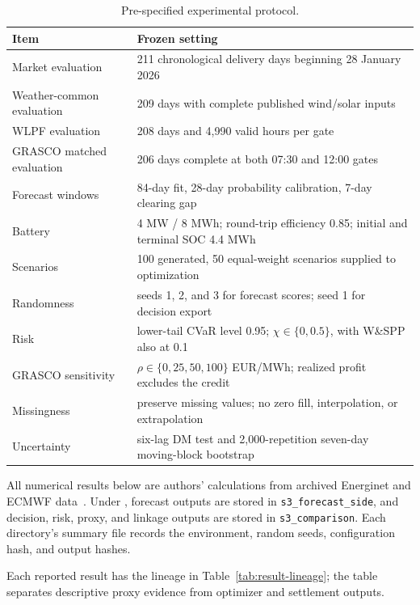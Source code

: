 \documentclass[11pt,a4paper]{article}
\begin{document}
\begin{table}[htbp]
  \centering
  \small
  \caption{Pre-specified experimental protocol.}
  \begin{tabular}{p{}p{}}
    \toprule
    Item & Frozen setting \\
    \midrule
    Market evaluation
      & 211 chronological delivery days beginning 28 January 2026 \\
    Weather-common evaluation
      & 209 days with complete published wind/solar inputs \\
    WLPF evaluation
      & 208 days and 4,990 valid hours per gate \\
    GRASCO matched evaluation
      & 206 days complete at both 07:30 and 12:00 gates \\
    Forecast windows
      & 84-day fit, 28-day probability calibration, 7-day clearing gap \\
    Battery
      & 4 MW / 8 MWh; round-trip efficiency 0.85; initial and terminal SOC 4.4 MWh \\
    Scenarios
      & 100 generated, 50 equal-weight scenarios supplied to optimization \\
    Randomness
      & seeds 1, 2, and 3 for forecast scores; seed 1 for decision export \\
    Risk
      & lower-tail CVaR level 0.95; $\chi\in\{0,0.5\}$, with W\&SPP also at 0.1 \\
    GRASCO sensitivity
      & $\rho\in\{0,25,50,100\}$ EUR/MWh; realized profit excludes the credit \\
    Missingness
      & preserve missing values; no zero fill, interpolation, or extrapolation \\
    Uncertainty
      & six-lag DM test and 2,000-repetition seven-day moving-block bootstrap \\
    \bottomrule
  \end{tabular}
  \label{tab:experimental-protocol}
\end{table}

All numerical results below are authors' calculations from archived Energinet
and ECMWF data~\cite{energineteds,openmeteo2026singleruns}.  Under
, forecast outputs are stored in
\texttt{s3\_forecast\_side}, and decision, risk, proxy, and linkage outputs are
stored in \texttt{s3\_comparison}.  Each directory's summary file
records the environment, random seeds, configuration hash, and output hashes.

Each reported result has the lineage in Table~\ref{tab:result-lineage}; the
table separates descriptive proxy evidence from optimizer and settlement
outputs.
\end{document}
